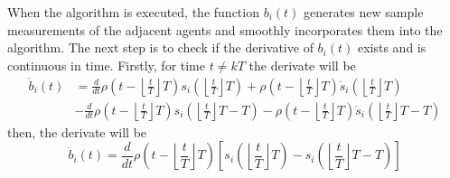     When the algorithm is executed, the function $b_i(t)$ generates new sample measurements of the adjacent agents and smoothly incorporates them into the algorithm. The next step is to check if the derivative of $b_i(t)$ exists and is continuous in time. Firstly, for time $t \neq kT$ the derivate will be
    \begin{equation*}
        \begin{align*}
            \dot{b}_i(t) &= \frac{d}{dt}\rho\left(t - \left\lfloor \frac{t}{T}\right\rfloor T \right)s_i\left(\left\lfloor \frac{t}{T} \right\rfloor T \right) + \rho\left(t - \left\lfloor \frac{t}{T}\right\rfloor T \right)\dot{s}_i\left(\left\lfloor \frac{t}{T} \right\rfloor T \right)\\
            &- \frac{d}{dt}\rho\left(t - \left\lfloor \frac{t}{T}\right\rfloor T \right)s_i\left(\left\lfloor \frac{t}{T} \right\rfloor T - T \right)  - \rho\left(t - \left\lfloor \frac{t}{T}\right\rfloor T \right)\dot{s}_i\left(\left\lfloor \frac{t}{T} \right\rfloor T - T \right)
        \end{align*}
    \end{equation*}
    then, the derivate will be
    \begin{equation}\label{eq:4.2.4}
        \dot{b}_i(t) = \frac{d}{dt}\rho\left(t - \left\lfloor \frac{t}{T}\right\rfloor T \right) \left[s_i\left(\left\lfloor \frac{t}{T} \right\rfloor T \right) - s_i\left(\left\lfloor \frac{t}{T} \right\rfloor T - T \right)\right]
    \end{equation}
    
